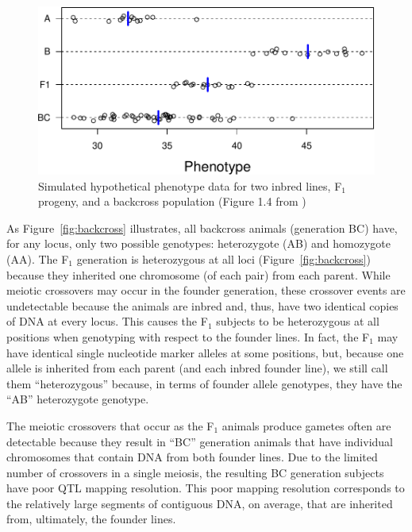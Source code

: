 \documentclass[oneside]{book}\usepackage[]{graphicx}\usepackage[]{color}
\newenvironment{knitrout}{}{} %
\begin{document}
\begin{knitrout}
\color{fgcolor}\begin{figure}
\includegraphics[width=\textwidth]{figure/bc-pheno-1} \caption[Simulated hypothetical phenotype data for two inbred lines, F$_1$ progeny, and a backcross population (Figure 1.4 from \cite{broman2009guide})]{Simulated hypothetical phenotype data for two inbred lines, F$_1$ progeny, and a backcross population (Figure 1.4 from \cite{broman2009guide})}\label{fig:bc-pheno}
\end{figure}


\end{knitrout}


As Figure~\ref{fig:backcross} illustrates, all backcross animals (generation
BC) have, for any locus, only two possible genotypes: heterozygote (AB)
and homozygote (AA).
The F$_1$ generation is heterozygous at all loci (Figure~\ref{fig:backcross}) because 
they inherited one chromosome (of each pair) from each parent.
While meiotic crossovers may occur in the founder generation, these crossover events are
undetectable because the animals are inbred and, thus, have two identical copies
of DNA at every locus. This causes the F$_1$ subjects to be heterozygous at all positions
when genotyping with respect to the founder lines.
In fact, the F$_1$ may have identical single nucleotide marker alleles at some
positions, but, because one allele is inherited from each parent (and each inbred
founder line), we still call them ``heterozygous'' because, in terms of founder allele genotypes, they have the ``AB'' heterozygote genotype.

The meiotic crossovers that occur as the F$_1$ animals produce gametes often
are detectable because they result in ``BC'' generation animals that have individual
chromosomes that contain DNA from both founder lines. Due to the limited number
of crossovers in a single meiosis, the resulting BC generation subjects have
poor QTL mapping resolution.
This poor mapping resolution corresponds to the relatively large segments
of contiguous DNA, on average, that are inherited from, ultimately, the founder lines.
\end{document}
